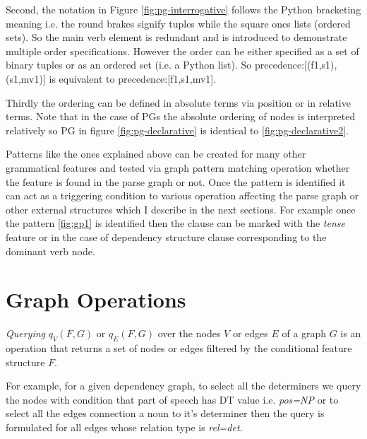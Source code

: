 Second, the notation in Figure \ref{fig:pg-interrogative} follows the Python bracketing meaning i.e. the round brakes signify tuples while the square ones lists (ordered sets). So the main verb element is redundant and is introduced to demonstrate multiple order specifications. However the order can be either specified as a set of binary tuples or as an ordered set (i.e. a Python list). So precedence:[(f1,s1),(s1,mv1)] is equivalent to precedence:[f1,s1,mv1]. 

Thirdly the ordering can be defined in absolute terms via position or in relative terms. Note that in the case of PGs the absolute ordering of nodes is interpreted relatively so PG in figure \ref{fig:pg-declarative} is identical to \ref{fig:pg-declarative2}.

Patterns like the ones explained above can be created for many other grammatical features and tested via graph pattern matching operation whether the feature is found in the parse graph or not. Once the pattern is identified it can act as a triggering condition to various operation affecting the parse graph or other external structures which I describe in the next sections. For example once the pattern \ref{fig:gp1} is identified then the clause can be marked with the \textit{tense} feature or in the case of dependency structure clause corresponding to the dominant verb node.

\section{Graph Operations}

\begin{definition}\label{def:query}
	\textit{Querying} $q_{V}(F,G)$ or $q_{E}(F,G)$ over the nodes $V$ or edges $E$ of a graph $G$ is an operation that returns a set of nodes or edges filtered by the conditional feature structure $F$.
\end{definition}

For example, for a given dependency graph, to select all the determiners we query the nodes with condition that part of speech has DT value i.e. \textit{pos=NP} or to select all the edges connection a noun to it's determiner then the query is formulated for all edges whose relation type is \textit{rel=det}.

